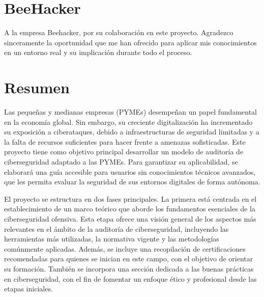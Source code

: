\documentclass[a4paper, 11pt]{article}
\begin{document}
\section*{BeeHacker}
\thispagestyle{empty}
\vfill
\begin{flushright}
\begin{minipage}{0.5\textwidth}
A la empresa Beehacker, por su colaboración en este proyecto. Agradezco sinceramente la oportunidad que me han ofrecido para aplicar mis conocimientos en un entorno real y su implicación durante todo el proceso.
\end{minipage}
\end{flushright}
\clearpage




\section*{Resumen}
\thispagestyle{empty}
Las pequeñas y medianas empresas (PYMEs) desempeñan un papel fundamental en la economía global. Sin embargo, su creciente digitalización ha incrementado su exposición a ciberataques, debido a infraestructuras de seguridad limitadas y a la falta de recursos suficientes para hacer frente a amenazas sofisticadas.
Este proyecto tiene como objetivo principal desarrollar un modelo de auditoría de ciberseguridad adaptado a las PYMEs. Para garantizar su aplicabilidad, se elaborará una guía accesible para usuarios sin conocimientos técnicos avanzados, que les permita evaluar la seguridad de sus entornos digitales de forma autónoma.

\par\vspace{0.5cm}

El proyecto se estructura en dos fases principales. La primera está centrada en el establecimiento de un marco teórico que aborde los fundamentos esenciales de la ciberseguridad ofensiva. Esta etapa ofrece una visión general de los aspectos más relevantes en el ámbito de la auditoría de ciberseguridad, incluyendo las herramientas más utilizadas, la normativa vigente y las metodologías comúnmente aplicadas. Además, se incluye una recopilación de certificaciones recomendadas para quienes se inician en este campo, con el objetivo de orientar su formación. También se incorpora una sección dedicada a las buenas prácticas en ciberseguridad, con el fin de fomentar un enfoque ético y profesional desde las etapas iniciales.
\end{document}
